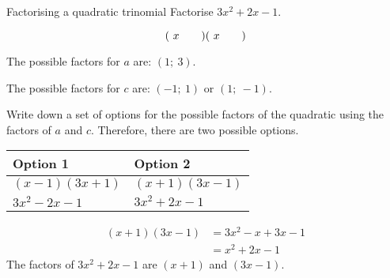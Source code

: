 \begin{wex}
{Factorising a quadratic trinomial}
{Factorise $3{x}^{2}+2x-1$.} 
{
\begin{equation*}
(\ x\phantom{\rule{2.em}{0ex}})(\ x\phantom{\rule{2.em}{0ex}})
\end{equation*}

The possible factors for $a$ are: $(1;~3)$.\par
The possible factors for $c$ are: $(-1;~1)$ or $(1;~-1)$.\par 
Write down a set of options for the possible factors of the quadratic using the factors of $a$ and $c$.
Therefore, there are two possible options.\par 

\begin{table}[H]
\begin{center}
\noindent

\begin{tabular}{|l|l|}\hline
\textbf{Option 1} &
\textbf{Option 2}%
\\ \hline
$(x-1)(3x+1)$
&
$(x+1)(3x-1)$
\\ \hline
$3{x}^{2}-2x-1$
&
\uline{$3{x}^{2}+2x-1$}
\\ \hline
\end{tabular}
\end{center}
\end{table}

\begin{align*}
  (x+1)(3x-1) &= 3{x}^{2}-x+3x-1 \\
  &= {x}^{2}+2x-1
\end{align*}
The factors of $3{x}^{2}+2x-1$ are $(x+1)$ and $(3x-1)$.
}
\end{wex}


